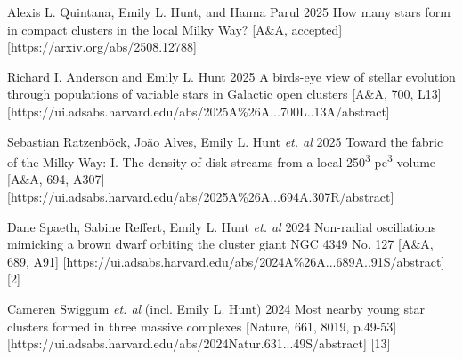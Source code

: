 \begin{etaremune}
    \item \publication 
        {Alexis L. Quintana, Emily L. Hunt, and Hanna Parul}
        {2025}
        {How many stars form in compact clusters in the local Milky Way?}
        [A\&A, accepted]
        [https://arxiv.org/abs/2508.12788]
    \item \publication 
        {Richard I. Anderson and Emily L. Hunt}
        {2025}
        {A birds-eye view of stellar evolution through populations of variable stars in Galactic open clusters}
        [A\&A, 700, L13]
        [https://ui.adsabs.harvard.edu/abs/2025A\%26A...700L..13A/abstract]
    \item \publication 
        {Sebastian Ratzenböck, João Alves, Emily L. Hunt \emph{et. al}}
        {2025}
        {Toward the fabric of the Milky Way: I. The density of disk streams from a local 250\textsuperscript{3} pc\textsuperscript{3} volume}
        [A\&A, 694, A307]
        [https://ui.adsabs.harvard.edu/abs/2025A\%26A...694A.307R/abstract]
    \item \publication
        {Dane Spaeth, Sabine Reffert, Emily L. Hunt \emph{et. al}}
        {2024}
        {Non-radial oscillations mimicking a brown dwarf orbiting the cluster giant NGC 4349 No. 127}
        [A\&A, 689, A91]
        [https://ui.adsabs.harvard.edu/abs/2024A\%26A...689A..91S/abstract]
        [2]
    \item \publication
        {Cameren Swiggum \emph{et. al} (incl. Emily L. Hunt)}
        {2024}
        {Most nearby young star clusters formed in three massive complexes }
        [Nature, 661, 8019, p.49-53]
        [https://ui.adsabs.harvard.edu/abs/2024Natur.631...49S/abstract]
        [13]
\end{etaremune}
